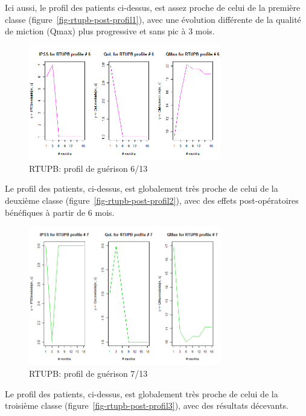 Ici aussi, le profil des patients ci-dessus, est assez proche de celui de la première classe (figure~\ref{fig-rtupb-post-profil1}), avec une évolution différente de la qualité de miction (Qmax) plus progressive et sans pic à 3 mois.

\begin{figure}[H]
\centering
\includegraphics[width=0.75\textwidth]{../Fig/RTUPB/rtupb-profil-post-06.png}
\caption[]{RTUPB: profil de guérison 6/13}
\label{fig-rtupb-post-profil6}
\end{figure}

Le profil des patients, ci-dessus, est globalement très proche de celui de la deuxième classe (figure~\ref{fig-rtupb-post-profil2}), avec des effets post-opératoires bénéfiques à partir de 6 mois.

\begin{figure}[H]
\centering
\includegraphics[width=0.75\textwidth]{../Fig/RTUPB/rtupb-profil-post-07.png}
\caption[]{RTUPB: profil de guérison 7/13}
\label{fig-rtupb-post-profil7}
\end{figure}

Le profil des patients, ci-dessus, est globalement très proche de celui de la troisième classe (figure~\ref{fig-rtupb-post-profil3}), avec des résultats décevants.

